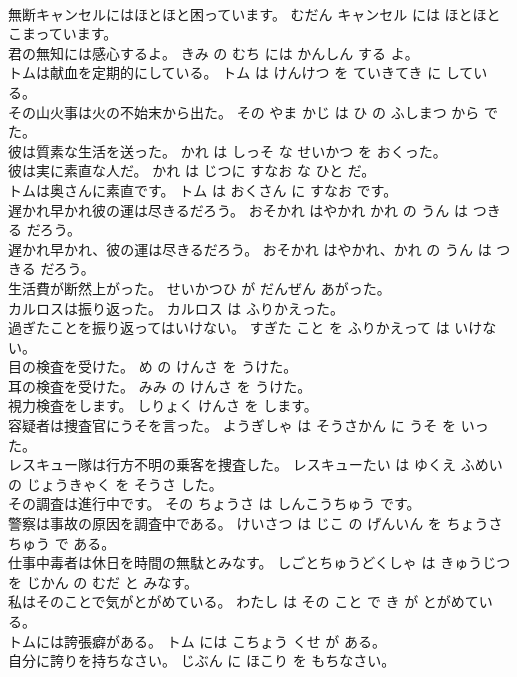 \documentclass[8pt]{extreport}
\begin{document}
\begin{CJK}{UTF8}{min}
\\	無断キャンセルにはほとほと困っています。	むだん キャンセル には ほとほと こまっています。	
\\	君の無知には感心するよ。	きみ の むち には かんしん する よ。	
\\	トムは献血を定期的にしている。	トム は けんけつ を ていきてき に している。	
\\	その山火事は火の不始末から出た。	その やま かじ は ひ の ふしまつ から でた。	
\\	彼は質素な生活を送った。	かれ は しっそ な せいかつ を おくった。	
\\	彼は実に素直な人だ。	かれ は じつに すなお な ひと だ。	
\\	トムは奥さんに素直です。	トム は おくさん に すなお です。	
\\	遅かれ早かれ彼の運は尽きるだろう。	おそかれ はやかれ かれ の うん は つきる だろう。	
\\	遅かれ早かれ、彼の運は尽きるだろう。	おそかれ はやかれ、かれ の うん は つきる だろう。	
\\	生活費が断然上がった。	せいかつひ が だんぜん あがった。	
\\	カルロスは振り返った。	カルロス は ふりかえった。	
\\	過ぎたことを振り返ってはいけない。	すぎた こと を ふりかえって は いけない。	
\\	目の検査を受けた。	め の けんさ を うけた。	
\\	耳の検査を受けた。	みみ の けんさ を うけた。	
\\	視力検査をします。	しりょく けんさ を します。	
\\	容疑者は捜査官にうそを言った。	ようぎしゃ は そうさかん に うそ を いった。	
\\	レスキュー隊は行方不明の乗客を捜査した。	レスキューたい は ゆくえ ふめい の じょうきゃく を そうさ した。	
\\	その調査は進行中です。	その ちょうさ は しんこうちゅう です。	
\\	警察は事故の原因を調査中である。	けいさつ は じこ の げんいん を ちょうさちゅう で ある。	
\\	仕事中毒者は休日を時間の無駄とみなす。	しごとちゅうどくしゃ は きゅうじつ を じかん の むだ と みなす。	
\\	私はそのことで気がとがめている。	わたし は その こと で き が とがめている。	
\\	トムには誇張癖がある。	トム には こちょう くせ が ある。	
\\	自分に誇りを持ちなさい。	じぶん に ほこり を もちなさい。	

\end{CJK}
\end{document}
